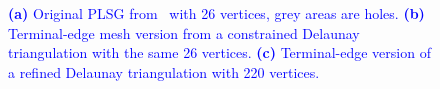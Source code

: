 \begin{figure}[!h]
\centering     %
{} \hspace{0.5cm}
\hspace{0.5cm}
\caption{\textcolor{blue}{\textbf{(a)} Original PLSG from~\cite{Shewchuktriangle} with 26 vertices, grey areas are holes. \textbf{(b)} Terminal-edge mesh version from a constrained Delaunay triangulation with the same 26 vertices. \textbf{(c)} Terminal-edge version of a refined Delaunay triangulation with 220 vertices.}}
\label{figs:facePSLG} 
\end{figure}


